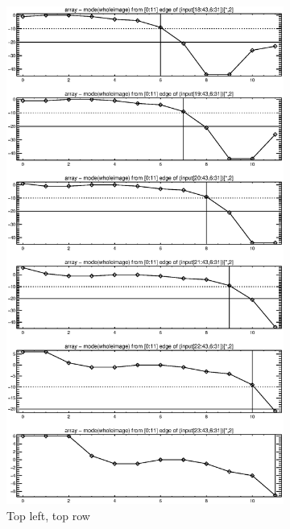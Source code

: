 \documentclass[10pt]{article}
\begin{document}
\begin{figure}[!h]
    \centering 
    \hspace{-1.0in}
    \begin{subfigure}[b]{.4\linewidth}
        \centering
        \includegraphics[width=1.4\textwidth]{plots_tables_images/topright2.eps} 
        \caption{Top left, top row}
    \end{subfigure}
    \hspace{1.0in}
    \begin{subfigure}[b]{.4\linewidth}

\end{subfigure}
\end{figure}
\end{document}
